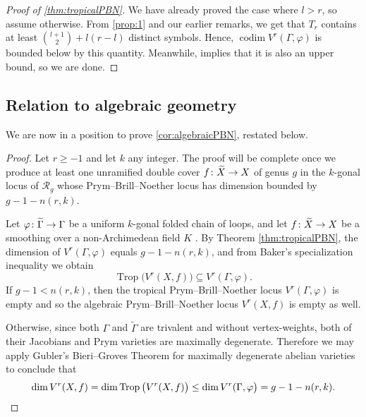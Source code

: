 \documentclass[11pt,reqno]{amsart}
\newcommand*{\cR}{\mathcal{R}}
\newcommand*{\maps}{\nobreak\mskip2mu\mathpunct{}\nonscript
  \mkern-\thinmuskip{:}\mskip6muplus1mu\relax}
\newcommand*{\wti}[1]{\widetilde{#1}}
\DeclareMathOperator{\codim}{codim}
\DeclareMathOperator{\trop}{Trop}
\theoremstyle{definition}
\theoremstyle{problem}
\theoremstyle{plain}
\theoremstyle{remark}
\theoremstyle{theorem}
\numberwithin{equation}{section}
\numberwithin{figure}{section}
\begin{document}
\begin{proof}[Proof of \cref{thm:tropicalPBN}]
  We have already proved the case where $l > r$, so assume otherwise.
  From \cref{prop:1} and our earlier remarks, we get that $T_r$
  contains at least $\binom{l+1}{2} + l(r-l)$ distinct symbols.
  Hence, $\codim V^r(\Gamma,\varphi)$ is bounded below by this
  quantity.  Meanwhile, \cite[Corollary~6.2.2, Remark~6.2.3]{len2019skeletons}
   implies that it is also
  an upper bound, so we are done.
\end{proof}

\subsection{Relation to algebraic
  geometry}\label{sec:algebraic-dim-proof}
We are now in a position to prove \cref{cor:algebraicPBN}, restated
below.  

\algebraicPBN*
\begin{proof}
  Let $r\geq -1$ and let $k$ any integer.  The proof will be complete
  once we produce at least one unramified double cover
  $f \maps \wti{X} \to X$ of genus $g$ in the $k$-gonal locus of
  $\cR_g$ whose Prym--Brill--Noether locus has dimension bounded by
  $g-1-n(r,k)$.
  
  Let $\varphi\maps\wti\Gamma\rightarrow \Gamma$ be a uniform
  $k$-gonal folded chain of loops, and let
  $f\maps \wti{X}\rightarrow X$ be a smoothing over a non-Archimedean
  field $K$ \cite[Lemma~7.0.1]{len2019skeletons}.  By Theorem
  \ref{thm:tropicalPBN}, the dimension of $V^r(\Gamma,\varphi)$ equals
  $g-1-n(r,k)$, and from Baker's specialization inequality
  \cite[Corollary 2.11]{Baker_specialization} we obtain
  \begin{equation*}
  \trop\big(V^r(X,f)\big) \subseteq V^r(\Gamma,\varphi).
  \end{equation*} 
  If $g-1<n(r,k)$, then the tropical Prym--Brill--Noether locus
  $V^r(\Gamma,\varphi)$ is empty and so the algebraic
  Prym--Brill--Noether locus $V^{r}(X,f)$ is empty as well.
  
  Otherwise, since both $\Gamma$ and $\wti\Gamma$ are trivalent and
  without vertex-weights, both of their Jacobians and Prym varieties
  are maximally degenerate. Therefore we may apply Gubler's
  Bieri--Groves Theorem for maximally degenerate abelian varieties
  \cite[Theorem 6.9]{Gubler_trop&nonArch} to conclude that
  \begin{equation*}
    \dim V^r(X,f)= \dim \trop\big(V^r(X,f)\big)\leq \dim V^r(\Gamma,\varphi\big)=g-1-n(r,k).\qedhere
  \end{equation*}
\end{proof}
\end{document}
